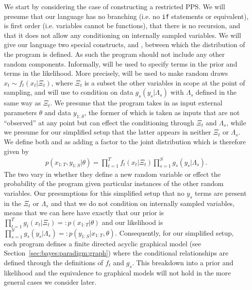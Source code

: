 We start by considering the case of constructing a restricted PPS.  We will presume that our
language has no branching (i.e. no \texttt{if} statements or equivalent), is  first order
(i.e. variables cannot be functions), that there is no recursion, and that it does not allow 
any conditioning on internally sampled variables.  
We will give our language
two special constructs, \sample and \observe, between which the distribution of the
program is defined.  As such the program should not include any other random components.
Informally, \sample will be used to specify terms in the prior and \observe terms in the
likelihood.  More precisely, \sample will be used to make random draws $x_t \sim f_t(x_t | \Xi_t)$,
where $\Xi_t$ is a subset the other variables in scope at the point of sampling, and \observe will use to condition on
data $g_s(y_s|\Lambda_s)$ with $\Lambda_s$ defined in the same way as $\Xi_t$.  We presume that the program takes 
in as input external parameters $\theta$ and data $y_{1:S}$, the former of which is taken as inputs that are 
not ``observed'' at any point but can effect the conditioning through $\Xi_t$ and $\Lambda_s$, while we presume 
for our simplified setup that the latter appears in neither $\Xi_t$ or $\Lambda_s$.
We define both \sample and \observe as adding a factor to the joint distribution which is therefore given by
\begin{align}
\label{eq:probprog:simple-joint}
p(x_{1:T},y_{1:S} | \theta) = \prod_{t=1}^{T} f_t(x_t | \Xi_t) \prod_{s=1}^{S} g_s(y_s|\Lambda_s).
\end{align}
The two vary in whether they define a new random variable or effect the probability of the
program given particular instances of the other random variables.
Our presumptions for this simplified setup that no $y_{s}$ terms are present in the $\Xi_t$ or $\Lambda_s$
and that we do not condition on internally sampled variables, means that we can here have
exactly that our prior is $\prod_{t=1}^{T} g_t(x_t | \Xi_t) =: p(x_{1:T} | \theta)$ and our likelihood is
$\prod_{s=1}^{S} g_s(y_s|\Lambda_s) =: p(y_{1:S} | x_{1:T}, \theta)$.  Consequently, for our simplified setup,
each program defines a finite directed acyclic graphical model (see Section~\ref{sec:bayes:paradigm:graph})
where the conditional relationships are defined through the definitions of $f_t$ and $g_s$.
This breakdown into a prior and likelihood and the equivalence to graphical models
will not hold in the more general cases we consider later.  

